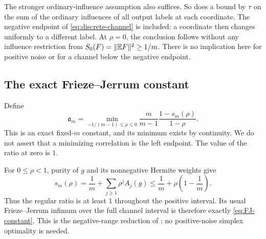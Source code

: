 The stronger ordinary-influence assumption also suffices. So does a
bound by $\tau$ on the sum of the ordinary influences of all output
labels at each coordinate. The negative endpoint of
\eqref{eq:discrete-channel} is included: a coordinate then changes
uniformly to a different label. At $\rho=0$, the conclusion follows
without any influence restriction from $S_0(F)=\lVert \mathbb E F\rVert^2\ge1/m$.
There is no implication here for positive noise or for a channel below
the negative endpoint.

\subsection{The exact Frieze--Jerrum constant}
Define
\begin{equation}\label{eq:FJ-constant}
 \mathfrak a_m=\min_{-1/(m-1)\le\rho\le0}
       \frac{m}{m-1}\frac{1-s_m(\rho)}{1-\rho}.
\end{equation}
This is an exact fixed-$m$ constant, and its minimum exists by
continuity. We do not assert that a minimizing correlation is the left
endpoint. The value of the ratio at zero is $1$.

For $0\le\rho<1$, purity of $g$ and its nonnegative Hermite weights give
\[
 s_m(\rho)=\frac1m+\sum_{j\ge1}\rho^j A_j(g)
      \le\frac1m+\rho\left(1-\frac1m\right).
\]
Thus the regular ratio is at least $1$ throughout the positive interval.
Its usual Frieze--Jerrum infimum over the full channel interval is
therefore exactly \eqref{eq:FJ-constant}. This is the negative-range
reduction of \cite[Lemma~A.4]{IM}; no positive-noise simplex optimality
is needed.

